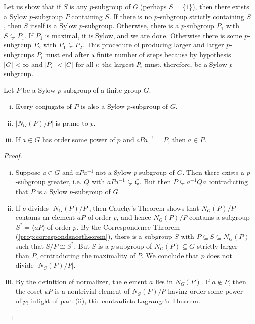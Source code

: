 \documentclass[../main.tex]{subfiles}
\begin{document}
Let us show that if $S$ is any $p$-subgroup of $G$ (perhaps $S = \{1\}$), then there exists a Sylow $p$-subgroup $P$ containing $S$. If there is no $p$-subgroup strictly containing $S$, then $S$ itself is a Sylow $p$-subgroup. Otherwise, there is a $p$-subgroup $P_1$ with $S\varsubsetneq P_1$. If $P_1$ is maximal, it is Sylow, and we are done. Otherwise there is some $p$-subgroup $P_2$ with $P_1\varsubsetneq P_2$. This procedure of producing larger and larger $p$-subgroups $P_i$ must end after a finite number of steps because by hypothesis $|G|<\infty$ and $|P_i|<|G|$ for all $i$; the largest $P_i$ must, therefore, be a Sylow $p$-subgroup.

\begin{lema}
Let $P$ be a Sylow $p$-subgroup of a finite group $G$.
\begin{enumerate}[(i)]
    \item Every conjugate of $P$ is also a Sylow $p$-subgroup of $G$.
    \item $|N_G(P)/P|$ is prime to $p$.
    \item If $a\in G$ has order some power of $p$ and $aPa^{-1} = P$, then $a\in P$.
\end{enumerate}
\end{lema}
\begin{proof}
\begin{enumerate}[(i)]
    \item Suppose $a\in G$ and $aPa^{-1}$ not a Sylow $p$-subgroup of $G$. Then there exists a $p$-subgroup greater, i.e. $Q$ with $aPa^{-1}\varsubsetneq Q$. But then $P\varsubsetneq a^{-1}Qa$ contradicting that $P$ is a Sylow $p$-subgroup of $G$.
    
    \item If $p$ divides $|N_G(P)/P|$, then Cauchy's Theorem shows that $N_G(P)/P$ contains an element $aP$ of order $p$, and hence $N_G(P)/P$ contains a subgroup $S^*=\langle aP\rangle$ of order $p$. By the Correspondence Theorem (\ref{prop:correspondencetheorem}), there is a subgroup $S$ with $P\subseteq S\subseteq N_G(P)$ such that $S/P\cong S^*$. But $S$ is a $p$-subgroup of $N_G(P)\subseteq G$ strictly larger than $P$, contradicting the maximality of $P$. We conclude that $p$ does not divide $|N_G(P)/P|$.
    
    \item By the definition of normalizer, the element $a$ lies in $N_G(P)$. If $a\not\in P$, then the coset $aP$ is a nontrivial element of $N_G(P)/P$ having order some power of $p$; inlight of part (ii), this contradicts Lagrange's Theorem.
\end{enumerate}
\end{proof}
\end{document}
